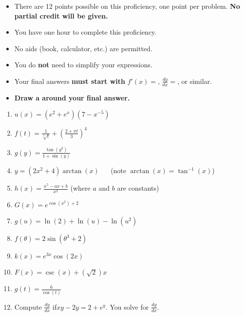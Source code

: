 \documentclass[12pt]{article}
\newcommand{\ds}{\displaystyle}
\begin{document}
\begin{itemize}
\addtolength\itemsep{-1mm}
\item There are 12 points possible on this proficiency, one point per problem. {\bf No partial credit will be given.}

\item You have one hour to complete this proficiency.

\item No aids (book, calculator, etc.) are permitted.  

\item You do \textbf{not} need to simplify your expressions.



\item Your final answers \textbf{must start with} $f'(x)=$, $\frac{dy}{dx}=$, or similar.

\item {\bf Draw a  around your final answer.}
\end{itemize}


\begin{enumerate}
\item $\ds u(x) = (e^2 + e^x)(7 - x^{-5})$ \vfill
\item $\ds f(t) = \frac{1}{\sqrt[3]{t}} + \left( \frac{2 + \pi t}{3} \right)^{4}$ \vfill
\item $\ds g(y) = \frac{\tan(y^2)}{1 + \sin (y)}$\vfill
\newpage
\item $\ds y = (2x^2 + 4)\arctan (x)$ $\quad$ (note $\arctan(x) = \tan^{-1}(x)$)\vfill
\item $\ds h(x) = \frac{x^5 - ax + b}{x^2}$ (where $a$ and $b$ are constants)\vfill
\item $\ds G(x) = e^{\cos(x^{2}) + 2}$ \vfill

\newpage
\item $\ds g(u) =  \ln(2) +\ln(u) - \ln(u^2)$ \vfill
\item $\ds f(\theta) = 2\sin\left(\theta^3 + 2\right)$ \vfill
\item $\ds k(x) = e^{3x}\cos(2x)$ \vfill
\newpage
\item $\ds F(x) = \csc(x) + (\sqrt{2})x$ \vfill
\item $\ds g(t) = \frac{6}{\cos (t)}$ \vfill
\item Compute $\frac{dy}{dx}$ if\quad $xy - 2y = 2 + e^y$. You  solve for $\frac{dy}{dx}$.
\vspace{3.5in}


\end{enumerate}
\end{document}
